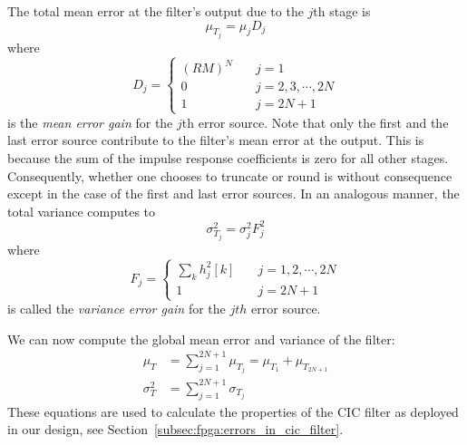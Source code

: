 The total mean error at the filter's output due to the $j$th stage is
\begin{equation}
    \label{eq:cic:truncation_rounding:total_mean_error_jth_stage}
    \mu_{T_j} = \mu_jD_j
\end{equation}
where
\begin{equation}
    \label{eq:cic:truncation_rounding:mean_error_gain}
    D_j = \left\lbrace
        \begin{aligned}
            (RM)^N         & \quad j = 1\\
            0              & \quad j = 2, 3, \cdots, 2N\\
            1              & \quad j = 2N+1
        \end{aligned}
    \right.
\end{equation}
is the \emph{mean  error gain} for the $j$th error  source. Note that only the
first and the last  error source contribute to the filter's  mean error at the
output. This is because  the sum of the impulse response  coefficients is zero
for all other  stages. Consequently, whether one chooses to  truncate or round
is  without  consequence except  in  the  case of  the  first  and last  error
sources. In an analogous manner, the total variance computes to
\begin{equation}
    \label{eq:cic:truncation_rounding:total_variance_jth_stage}
    \sigma_{T_j}^2 = \sigma_j^2F_j^2
\end{equation}
where
\begin{equation}
    \label{eq:cic:truncation_rounding:variance_error_gain}
    F_j = \left\lbrace
        \begin{aligned}
            \sum_k h_j^2[k]  & \quad j = 1, 2, \cdots, 2N\\
            1                & \quad j = 2N+1
        \end{aligned}
    \right.
\end{equation}
is called the \emph{variance error gain} for the $jth$ error source.

We can now compute the global mean error and variance of the filter:
\begin{align}
    \label{eq:cic:truncation_rounding:global:mean_error}
    \mu_T &= \sum_{j = 1}^{2N+1} \mu_{T_j} = \mu_{T_1} + \mu_{T_{2N+1}}\\
    \label{eq:cic:truncation_rounding:global:variance}
    \sigma_{T}^2 &= \sum_{j=1}^{2N+1} \sigma_{T_j}
\end{align}
These equations  are used  to calculate  the properties of  the CIC  filter as
deployed in our design, see Section~\ref{subsec:fpga:errors_in_cic_filter}.

